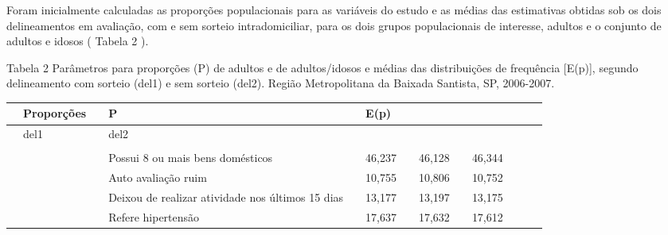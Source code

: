 \documentclass{article}
\begin{document}
Foram inicialmente calculadas as proporções populacionais para as variáveis do estudo e as médias das estimativas obtidas sob os dois delineamentos em avaliação, com e sem sorteio intradomiciliar, para os dois grupos populacionais de interesse, adultos e o conjunto de adultos e idosos (%
Tabela 2%
).

Tabela 2%
Parâmetros para proporções (P) de adultos e de adultos/idosos e médias das distribuições de frequência [E(p)], segundo delineamento com sorteio (del1) e sem sorteio (del2). Região Metropolitana da Baixada Santista, SP, 2006-2007.%
\begin{tabular}{| l | l | l | l | l | l | l | l | l || l | l | l | l |}
\hline
 & Proporções & %
 & P & %
 & E(p)  & %
 & %
 & %
\\ \hline 
 & del1 & %
 & del2\\ \hline 
 & \multirow{1}{*}{\multicolumn{2}{l}{Adultos}}
 & %
 & 
 & %
 & 
\\ \hline 

 & 
 & %
 & Possui 8 ou mais bens domésticos
 & %
 & 46,237
 & %
 & 46,128
 & %
 & 46,344
\\ \hline 

 & 
 & %
 & Auto avaliação ruim
 & %
 & 10,755
 & %
 & 10,806
 & %
 & 10,752
\\ \hline 

 & 
 & %
 & Deixou de realizar atividade nos últimos 15 dias
 & %
 & 13,177
 & %
 & 13,197
 & %
 & 13,175
\\ \hline 

 & 
 & %
 & Refere hipertensão
 & %
 & 17,637
 & %
 & 17,632
 & %
 & 17,612
\\ \hline 


\end{tabular}
\end{document}
